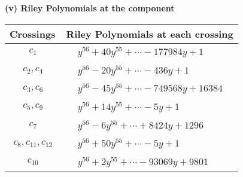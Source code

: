 \documentclass[1p]{elsarticle_modified}
\theoremstyle{definition}
\begin{document}
\flushleft \textbf{(v) Riley Polynomials at the component}\newline \\
\begin{tabular}{m{50pt}|m{274pt}}
Crossings & \hspace{64pt}Riley Polynomials at each crossing \\
\hline $$\begin{aligned}c_{1}\end{aligned}$$&$\begin{aligned}
&y^{56}+40 y^{55}+\cdots-177984 y+1
\end{aligned}$\\
\hline $$\begin{aligned}c_{2},c_{4}\end{aligned}$$&$\begin{aligned}
&y^{56}-20 y^{55}+\cdots-436 y+1
\end{aligned}$\\
\hline $$\begin{aligned}c_{3},c_{6}\end{aligned}$$&$\begin{aligned}
&y^{56}-45 y^{55}+\cdots-749568 y+16384
\end{aligned}$\\
\hline $$\begin{aligned}c_{5},c_{9}\end{aligned}$$&$\begin{aligned}
&y^{56}+14 y^{55}+\cdots-5 y+1
\end{aligned}$\\
\hline $$\begin{aligned}c_{7}\end{aligned}$$&$\begin{aligned}
&y^{56}-6 y^{55}+\cdots+8424 y+1296
\end{aligned}$\\
\hline $$\begin{aligned}c_{8},c_{11},c_{12}\end{aligned}$$&$\begin{aligned}
&y^{56}+50 y^{55}+\cdots-5 y+1
\end{aligned}$\\
\hline $$\begin{aligned}c_{10}\end{aligned}$$&$\begin{aligned}
&y^{56}+2 y^{55}+\cdots-93069 y+9801
\end{aligned}$\\
\hline
\end{tabular}\\~\\
\end{document}
